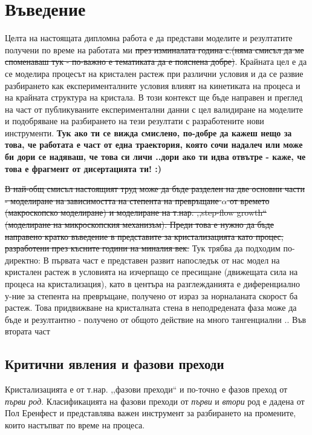 \setcounter{page}{2}
\section{Въведение}
Целта на настоящата дипломна работа е да представи моделите и резултатите получени по време на работата ми \sout{през изминалата година с.(няма смисъл да ме споменаваш тук - по-важно е тематиката да е пояснена добре)}. Крайната цел е да се моделира процесът на кристален растеж при различни условия и да се развие разбирането как експерименталните условия влияят на кинетиката на процеса и на крайната структура на кристала. В този контекст ще бъде направен и преглед на част от публикуваните експериментални данни с цел валидиране на моделите и подобряване на разбирането на тези резултати с разработените нови инструменти.
\textbf{Тук ако ти се вижда смислено, по-добре да кажеш нещо за това, че работата е част от една траектория, която сочи надалеч или може би дори се надяваш, че това си личи ..дори ако ти идва отвътре - каже, че това е фрагмент от дисертацията ти! :)}

\sout{В най-общ смисъл настоящият труд може да бъде разделен на две основни части - моделиране на зависимостта на степента на превръщане $\alpha$ от времето (макроскопско моделиране) и моделиране на т.нар. ,,step-flow growth``  (моделиране на микроскопския механизъм). Преди това е нужно да бъде направено кратко въведение в представите за кристализацията като процес, разработени през късните години на миналия век.}
Тук трябва да подходим по-директно:
В първата част е представен развит напоследък от нас модел на кристален растеж в условията на изчерпащо се пресищане (движещата сила на процеса на кристализация), като в центъра на разглежданията е диференциално у-ние за степента на превръщане, получено от израз за норналаната скорост ба растеж.
Това придвижване на кристалната стена в неподредената фаза може да бъде и резултантно - получено от общото действие на много тангенциални .. Във втората част 

\subsection{Критични явления и фазови преходи}
Кристализацията е от т.нар. ,,фазови преходи`` и по-точно е фазов преход от \textit{първи род}. Класификацията на фазови преходи от \textit{първи} и \textit{втори} род е дадена от Пол Еренфест \cite{Jaeger1998} \cite{atkinspaula2008} и представлява важен инструмент за разбирането на промените, които настъпват по време на процеса.

